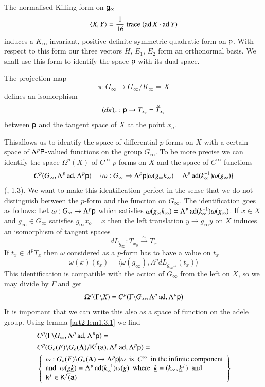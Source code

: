 The normalised Killing form on $\mathsf{g}_{\infty}$
$$
\langle X,Y\rangle =\frac{1}{16} \text{~trace~}(\operatorname{ad} X\cdot \operatorname{ad} Y)
$$
induces a $K_{\infty}$ invariant, positive definite symmetric quadratic form on $\mathsf{p}$. With respect to this form our three vectors $H$, $E_{1}$, $E_{2}$ form an orthonormal basis. We shall use this form to identify the space $\mathsf{p}$ with its dual space.

The projection map
$$
\pi:G_{\infty}\to G_{\infty}/K_{\infty}=X
$$
defines an isomorphism
$$
(d\pi)_{e}:\mathsf{p}\to T_{x_{o}}=\check{T}_{x_{o}}
$$
between $\mathsf{p}$ and the tangent space of $X$ at the point $x_{o}$.

This\pageoriginale allows us to identify the space of differential $p$-forms on $X$ with a certain space of $\Lambda {}^{p}\mathsf{P}$-valued functions on the group $G_{\infty}$. To be more precise we can identify the space $\Omega^{p}(X)$ of $C^{\infty}$-$p$-forms on $X$ and the space of $C^{\infty}$-functions
$$
C^{p}(G_{\infty},\Lambda^{p}\operatorname{ad},\Lambda^{p}\mathsf{p})=\{\omega:G_{\infty}\to \Lambda^{p}\mathsf{p}|\omega(g_{\infty}k_{\infty})=\Lambda^{p}\operatorname{ad}(k^{-1}_{\infty})\omega(g_{\infty})\}
$$
(\cite{art2-key8}, 1.3). We want to make this identification perfect in the sense that we do not distinguish between the $p$-form and the function on $G_{\infty}$. The identification goes as follows: Let $\omega:G_{\infty}\to \Lambda {}^{p}\mathsf{p}$ which satisfies $\omega(g_{\infty}k_{\infty})=\Lambda^{p}\operatorname{ad}(k^{-1}_{\infty})\omega(g_{\infty})$. If $x\in X$ and $g_{\infty}\in G_{\infty}$ satisfies $g_{\infty}x_{o}=x$ then the left translation $y\to g_{\infty}y$ on $X$ induces an isomorphism of tangent spaces
$$
dL_{g_{\infty}}:T_{x_{o}}\xrightarrow{\sim}T_{x}
$$
If $t_{x}\in \Lambda^{p}T_{x}$ then $\omega$ considered as a $p$-form has to have a value on $t_{x}$
\begin{equation}
\omega(x)(t_{x})=\langle \omega(g_{\infty}),\Lambda^{p}dL_{g_{\infty^{-1}}}(t_{x})\rangle\label{art2-eq1.4.2}
\end{equation}
This identification is compatible with the action of $G_{\infty}$ from the left on $X$, so we may divide by $\Gamma$ and get
$$
\Omega^{p}(\Gamma\backslash X)=C^{p}(\Gamma\backslash G_{\infty},\Lambda^{p}\operatorname{ad},\Lambda^{p}\mathsf{p})
$$
It is important that we can write this also as a space of function on the adele group. Using lemma \ref{art2-lem1.3.1} we find
\begin{align*}
& C^{p}(\Gamma\backslash G_{\infty},\Lambda^{p}\operatorname{ad},\Lambda^{p}\mathsf{p})=\\
& C^{p}(G_{o}(F)\backslash G_{o}(\mathbf{A})/\mathsf{K}^{f}(\mathsf{a}),\Lambda^{p}\operatorname{ad},\Lambda^{p}\mathsf{p})=\\
& 
\left\{
\begin{array}{l}
\omega:G_{o}(F)\backslash G_{o}(\mathbf{A})\to \Lambda^{p}\mathsf{p}|\omega\text{~ is~ } C^{\infty}\text{~ in the infinite component}\\
\text{and~ }\omega(\underline{g}\underline{k})=\Lambda^{p}\operatorname{ad}(k^{-1}_{\infty})\omega(g)\text{~ where~ } \underline{k}=(k_{\infty},\underline{k}^{f})\text{~ and}\\
\mathsf{k}^{f}\in \mathsf{K}^{f}(\mathsf{a})
\end{array}\right\}
\end{align*}

